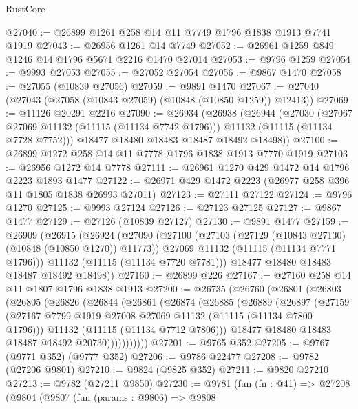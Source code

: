 \begin{lexlean}{RustCore}
\begin{coremodule}
@27040 := @26899 @1261 @258 @14 @11 @7749 @1796 @1838 @1913 @7741 @1919
@27043 := @26956 @1261 @14 @7749
@27052 := @26961 @1259 @849 @1246 @14 @1796 @5671 @2216 @1470 @27014
@27053 := @9796 @1259
@27054 := @9993 @27053
@27055 := @27052 @27054
@27056 := @9867 @1470
@27058 := @27055 (@10839 @27056)
@27059 := @9891 @1470
@27067 := @27040 (@27043 (@27058 (@10843 @27059) (@10848 (@10850 @1259)) @12413))
@27069 := @11126 @20291 @2216
@27090 := @26934
    (@26938
      (@26944
        (@27030
          (@27067 @27069 @11132 (@11115 (@11134 @7742 @1796)))
          @11132
          (@11115 (@11134 @7728 @7752)))
        @18477
        @18480
        @18483
        @18487
        @18492
        @18498))
@27100 := @26899 @1272 @258 @14 @11 @7778 @1796 @1838 @1913 @7770 @1919
@27103 := @26956 @1272 @14 @7778
@27111 := @26961 @1270 @429 @1472 @14 @1796 @2223 @1893 @1477
@27122 := @26971 @429 @1472 @2223 (@26977 @258 @396 @11 @1805 @1838 @26993 @27011)
@27123 := @27111 @27122
@27124 := @9796 @1270
@27125 := @9993 @27124
@27126 := @27123 @27125
@27127 := @9867 @1477
@27129 := @27126 (@10839 @27127)
@27130 := @9891 @1477
@27159 := @26909
    (@26915
      (@26924
        (@27090
          (@27100
            (@27103 (@27129 (@10843 @27130) (@10848 (@10850 @1270)) @11773))
            @27069
            @11132
            (@11115 (@11134 @7771 @1796)))
          @11132
          (@11115 (@11134 @7720 @7781)))
        @18477
        @18480
        @18483
        @18487
        @18492
        @18498))
@27160 := @26899 @226
@27167 := @27160 @258 @14 @11 @1807 @1796 @1838 @1913
@27200 := @26735
    (@26760
      (@26801
        (@26803
          (@26805
            (@26826
              (@26844
                (@26861
                  (@26874
                    (@26885
                      (@26889
                        (@26897
                          (@27159
                            (@27167 @7799 @1919 @27008 @27069 @11132 (@11115 (@11134 @7800 @1796)))
                            @11132
                            (@11115 (@11134 @7712 @7806)))
                          @18477
                          @18480
                          @18483
                          @18487
                          @18492
                          @20730)))))))))))
@27201 := @9765 @352
@27205 := @9767 (@9771 @352) (@9777 @352)
@27206 := @9786 @22477
@27208 := @9782 (@27206 @9801)
@27210 := @9824 (@9825 @352)
@27211 := @9820 @27210
@27213 := @9782 (@27211 @9850)
@27230 := @9781
    (fun (fn : @41) =>
    @27208
      (@9804
        (@9807
          (fun (params : @9806) =>
          @9808

\end{coremodule}
\end{lexlean}
